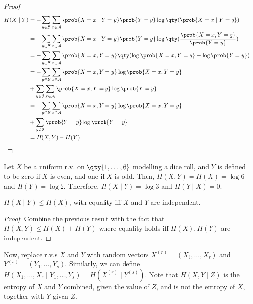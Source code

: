 \begin{proof}
    \begin{align*}
        H(X \mid Y) &= -\sum_{y \in \mathcal B} \sum_{x \in \mathcal A} \prob{X = x \mid Y = y} \prob{Y = y} \log \qty(\prob{X = x \mid Y = y}) \\
        &= -\sum_{y \in \mathcal B} \sum_{x \in \mathcal A} \prob{X = x \mid Y = y} \prob{Y = y} \log \qty(\frac{\prob{X = x, Y = y}}{\prob{Y = y}}) \\
        &= -\sum_{y \in \mathcal B} \sum_{x \in \mathcal A} \prob{X = x, Y = y} \qty(\log \prob{X = x, Y = y} - \log \prob{Y = y}) \\
        &= -\sum_{y \in \mathcal B} \sum_{x \in \mathcal A} \prob{X = x, Y = y} \log \prob{X = x, Y = y} \\
        &+ \sum_{y \in \mathcal B} \sum_{x \in \mathcal A} \prob{X = x, Y = y} \log \prob{Y = y} \\
        &= -\sum_{y \in \mathcal B} \sum_{x \in \mathcal A} \prob{X = x, Y = y} \log \prob{X = x, Y = y} \\
        &+ \sum_{y \in \mathcal B} \prob{Y = y} \log \prob{Y = y} \\
        &= H(X,Y) - H(Y)
    \end{align*}
\end{proof}

\begin{example}
    Let $X$ be a uniform r.v. on $\qty{1, \dots, 6}$ modelling a dice roll, and $Y$ is defined to be zero if $X$ is even, and one if $X$ is odd.
    Then, $H(X,Y) = H(X) = \log 6$ and $H(Y) = \log 2$.
    Therefore, $H(X \mid Y) = \log 3$ and $H(Y \mid X) = 0$.
\end{example}

\begin{corollary}
    $H(X\mid Y) \leq H(X)$, with equality iff $X$ and $Y$ are independent.
\end{corollary}

\begin{proof}
    Combine the previous result with the fact that $H(X,Y) \leq H(X) + H(Y)$ where equality holds iff $H(X), H(Y)$ are independent.
\end{proof}

Now, replace r.v.s $X$ and $Y$ with random vectors $X^{(r)} = (X_1, \dots, X_r)$ and $Y^{(s)} = (Y_1, \dots, Y_s)$.
Similarly, we can define $H(X_1, \dots, X_r \mid Y_1, \dots, Y_s) = H(X^{(r)} \mid Y^{(s)})$.
Note that $H(X,Y\mid Z)$ is the entropy of $X$ and $Y$ combined, given the value of $Z$, and is not the entropy of $X$, together with $Y$ given $Z$.

